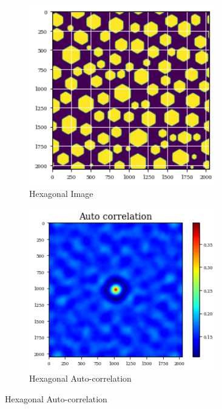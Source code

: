 \documentclass[12pt, a4paper]{report}
\begin{document}
\begin{figure}[H]
\begin{subfigure}{.45\textwidth}
  \centering
  \includegraphics[width=0.9\textwidth]{Pictures/Comparison/hexa_img.png}
  \caption{Hexagonal Image}
  \label{img:microstrImg}
\end{subfigure}
\begin{subfigure}{.5\textwidth}
  \centering
  \includegraphics[width=0.9\textwidth]{Pictures/Comparison/hexa_heatmap.png}
  \caption{Hexagonal Auto-correlation}
  \label{img:microstrImg}
\end{subfigure}


\end{figure}
\end{document}
